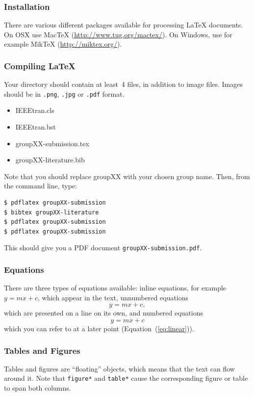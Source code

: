 \documentclass[10pt,conference,compsocconf]{IEEEtran}
\begin{document}
\subsubsection{Installation}

There are various different packages available for processing \LaTeX{}
documents.
On OSX use Mac\TeX{}
(\url{http://www.tug.org/mactex/}). On Windows, use for example Mik\TeX{} (\url{http://miktex.org/}).

\subsubsection{Compiling \LaTeX{}}
Your directory should contain at least~4 files, in addition to image
files. Images should be in \texttt{.png}, \texttt{.jpg} or
\texttt{.pdf} format.
\begin{itemize}
\item IEEEtran.cls
\item IEEEtran.bst
\item groupXX-submission.tex
\item groupXX-literature.bib
\end{itemize}
Note that you should replace groupXX with your chosen group name.
Then, from the command line, type:
\begin{verbatim}
$ pdflatex groupXX-submission
$ bibtex groupXX-literature
$ pdflatex groupXX-submission
$ pdflatex groupXX-submission
\end{verbatim}
This should give you a PDF document \texttt{groupXX-submission.pdf}.

\subsubsection{Equations}

There are three types of equations available: inline equations, for
example $y=mx + c$, which appear in the text, unnumbered equations
$$y=mx + c,$$
which are presented on a line on its own, and numbered equations
\begin{equation}
  \label{eq:linear}
  y = mx + c
\end{equation}
which you can refer to at a later point (Equation~(\ref{eq:linear})).

\subsubsection{Tables and Figures}

Tables and figures are ``floating'' objects, which means that the text
can flow around it.
Note
that \texttt{figure*} and \texttt{table*} cause the corresponding
figure or table to span both columns.
\end{document}

